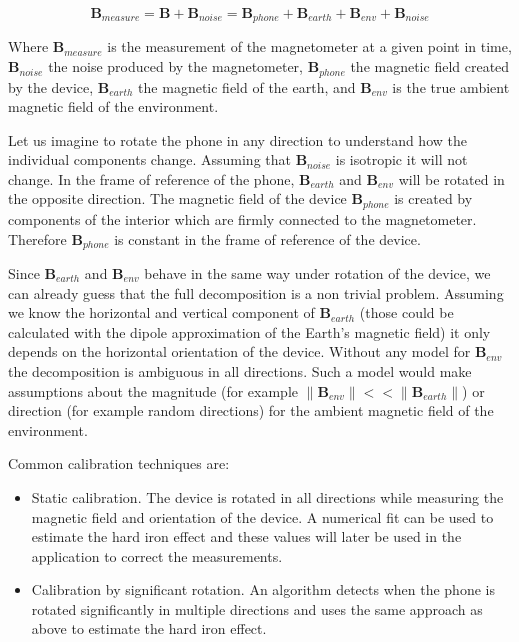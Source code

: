 \begin{equation}
\label{eq:decomposition}
    \bm{B}_{measure} = \bm{B} + \bm{B}_{noise} = \bm{B}_{phone} + \bm{B}_{earth} + \bm{B}_{env} + \bm{B}_{noise}
\end{equation}

Where $\bm{B}_{measure}$ is the measurement of the magnetometer at a given point in time, $\bm{B}_{noise}$ the noise produced by the magnetometer, $\bm{B}_{phone}$ the magnetic field created by the device, $\bm{B}_{earth}$ the magnetic field of the earth, and $\bm{B}_{env}$ is the true ambient magnetic field of the environment.

Let us imagine to rotate the phone in any direction to understand how the individual components change. Assuming that $\bm{B}_{noise}$ is isotropic it will not change. In the frame of reference of the phone, $\bm{B}_{earth}$ and $\bm{B}_{env}$ will be rotated in the opposite direction. The magnetic field of the device $\bm{B}_{phone}$ is created by components of the interior which are firmly connected to the magnetometer. Therefore $\bm{B}_{phone}$ is constant in the frame of reference of the device.

Since $\bm{B}_{earth}$ and $\bm{B}_{env}$ behave in the same way under rotation of the device, we can already guess that the full decomposition is a non trivial problem. Assuming we know the horizontal and vertical component of $\bm{B}_{earth}$ (those could be calculated with the dipole approximation of the Earth's magnetic field) it only depends on the horizontal orientation of the device. Without any model for $\bm{B}_{env}$ the decomposition is ambiguous in all directions. Such a model would make assumptions about the magnitude (for example $\lVert \bm{B}_{env} \rVert << \lVert \bm{B}_{earth} \rVert$) or direction (for example random directions) for the ambient magnetic field of the environment.

Common calibration techniques are:

\begin{itemize}
  \item Static calibration. The device is rotated in all directions while measuring the magnetic field and orientation of the device. A numerical fit can be used to estimate the hard iron effect and these values will later be used in the application to correct the measurements.
  \item Calibration by significant rotation. An algorithm detects when the phone is rotated significantly in multiple directions and uses the same approach as above to estimate the hard iron effect.
\end{itemize}

